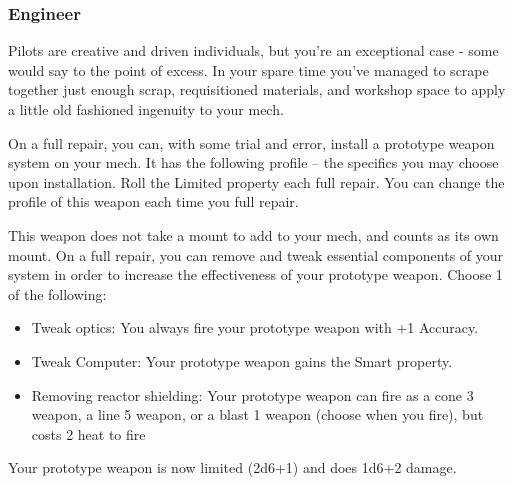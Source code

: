 \subsubsection{Engineer}

\begin{talent}
{Pilots are creative and driven individuals, but you’re an exceptional case - some would say to the point of excess. In your spare time you’ve managed to scrape together just enough scrap, requisitioned materials, and workshop space to apply a little old fashioned ingenuity to your mech.}

On a full repair, you can, with some trial and error, install a prototype weapon system on your mech. It has the following profile -- the specifics you may choose upon installation. Roll the Limited property each full repair. You can change the profile of this weapon each time you full repair. 

\gearBox
[name = {Prototype Weapon},
fluff = {},
template = {\Main (Choose 1; \Melee, \Rifle, \Cannon, \Launcher, \CQB)\newline
\Limited{1d6+2}, \Overcharged\newline
\Threat{1} (melee) or \Range{8} (ranged)\newline
1d6 \kinetic, \explosive or \energy damage}]
This weapon does not take a mount to add to your mech, and counts as its own mount.
On a full repair, you can remove and tweak essential components of your system in order to increase the effectiveness of your prototype weapon. 
Choose 1 of the following: 
\begin{itemize}
\item Tweak optics:
     You always fire your prototype weapon with +1 Accuracy. 
\item Tweak Computer: 
     Your prototype weapon gains the Smart property. 
\item Removing reactor shielding:
     Your prototype weapon can fire as a cone 3 weapon, a line 5 weapon, or a blast 1 weapon (choose when you fire), but costs 2 heat to fire
\end{itemize}
Your prototype weapon is now limited (2d6+1) and does 1d6+2 damage.
\end{talent}
